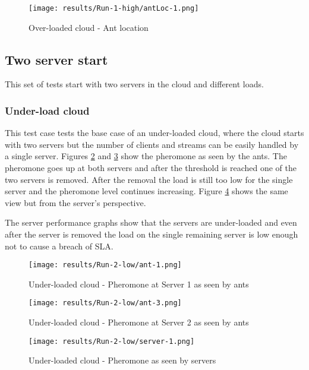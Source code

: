 \begin{figure}
	\centering
		\texttt{[image: results/Run-1-high/antLoc-1.png]}
	\caption{Over-loaded cloud - Ant location}
	\label{fig:1serv-antloc-high}
\end{figure}

\subsection{Two server start}

This set of tests start with two servers in the cloud and different loads.

\subsubsection{Under-load cloud}

This test case tests the base case of an under-loaded cloud, where the cloud starts with two servers but the number of clients and streams can be easily handled by a single server. Figures \ref{fig:2serv-ant1-low} and \ref{fig:2serv-ant3-low} show the pheromone as seen by the ants. The pheromone goes up at both servers and after the threshold is reached one of the two servers is removed. After the removal the load is still too low for the single server and the pheromone level continues increasing. Figure \ref{fig:2serv-pher-low} shows the same view but from the server's perspective.

The server performance graphs show that the servers are under-loaded and even after the server is removed the load on the single remaining server is low enough not to cause a breach of SLA.

\begin{figure}[!ht]
	\centering
		\texttt{[image: results/Run-2-low/ant-1.png]}
	\caption{Under-loaded cloud - Pheromone at Server 1 as seen by ants}
	\label{fig:2serv-ant1-low}
\end{figure}

\begin{figure}
	\centering
		\texttt{[image: results/Run-2-low/ant-3.png]}
	\caption{Under-loaded cloud - Pheromone at Server 2 as seen by ants}
	\label{fig:2serv-ant3-low}
\end{figure}

\begin{figure}
	\centering
		\texttt{[image: results/Run-2-low/server-1.png]}
	\caption{Under-loaded cloud - Pheromone as seen by servers}
	\label{fig:2serv-pher-low}
\end{figure}

